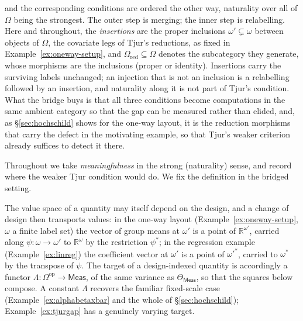 \documentclass[11pt,a4paper]{article}
\theoremstyle{plain}
\theoremstyle{definition}
\theoremstyle{remark}
\newcommand{\cat}[1]{\mathsf{#1}}
\newcommand{\catO}{\cat{\Omega}}
\newcommand{\Meas}{\cat{Meas}}
\newcommand{\op}{\mathrm{op}}
\newcommand{\R}{\mathbb{R}}
\begin{document}
and the corresponding conditions are ordered the other way, naturality over
all of $\catO$ being the strongest. The outer step is merging; the inner step
is relabelling. Here and throughout, the \emph{insertions} are the proper
inclusions $\omega' \subsetneq \omega$ between objects of $\catO$, the
covariate legs of Tjur's reductions, as fixed in Example~\ref{ex:oneway-setup},
and $\catO_{\mathrm{red}} \subseteq \catO$ denotes the subcategory they
generate, whose morphisms are the inclusions (proper or identity). Insertions
carry the surviving labels unchanged; an injection that is not an inclusion
is a relabelling followed by an insertion, and naturality along it is not
part of Tjur's condition. What the bridge buys is that all three
conditions become
computations in the same ambient category so that the gap can be measured rather
than elided, and, as \S\ref{sec:hochschild} shows for the one-way layout, it
is the reduction morphisms that carry the defect in the motivating example, so
that Tjur's weaker criterion already suffices to detect it there.

Throughout we take \emph{meaningfulness} in the strong (naturality) sense, and
record where the weaker Tjur condition would do. We fix the definition in the
bridged setting.

The value space of a quantity may itself depend on the design, and a change of
design then transports values: in the one-way layout
(Example~\ref{ex:oneway-setup}, $\omega$ a finite label set) the vector of
group means at $\omega'$ is a point of $\R^{\omega'}$, carried along
$\psi \colon \omega \to \omega'$ to $\R^{\omega}$ by the restriction
$\psi^{*}$; in the regression example (Example~\ref{ex:linreg}) the
coefficient vector at $\omega'$ is a point of $\omega'^{*}$, carried to
$\omega^{*}$ by the transpose of $\psi$. The target of a design-indexed
quantity is accordingly a functor $\Lambda \colon \catO^{\op} \to \Meas$, of
the same variance as $\Theta_\Meas$, so that the squares below compose. A
constant $\Lambda$ recovers the familiar fixed-scale case
(Example~\ref{ex:alphabetaxbar} and the whole of \S\ref{sec:hochschild});
Example~\ref{ex:tjurgap} has a genuinely varying target.
\end{document}
